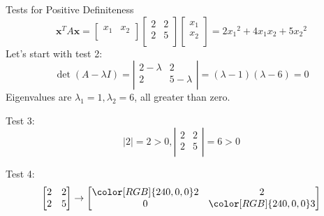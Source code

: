 \documentclass{beamer}
\begin{document}
\begin{frame}{Tests for Positive Definiteness}
\begin{equation*}
    \mathbf{x}^TA\mathbf{x}=\left[ \begin{matrix}
        x_1&		x_2\\
    \end{matrix} \right] \left[ \begin{matrix}
        2&		2\\
        2&		5\\
    \end{matrix} \right] \left[ \begin{array}{c}
        x_1\\
        x_2\\
    \end{array} \right] =2{x_1}^2+4x_1x_2+5{x_2}^2
\end{equation*}
Let's start with test 2:
\begin{equation*}
    \det \left( A-\lambda I \right) =\left| \begin{matrix}
        2-\lambda&		2\\
        2&		5-\lambda\\
    \end{matrix} \right|=\left( \lambda -1 \right) \left( \lambda -6 \right) =0
\end{equation*}
Eigenvalues are $\lambda _1=1, \lambda _2=6$, all greater than zero.

\vspace{3pt}
Test 3:
\begin{equation*}
    |2|=2>0, \left| \begin{matrix}
        2&		2\\
        2&		5\\
    \end{matrix} \right|=6>0
\end{equation*}

\vspace{3pt}
Test 4:
\begin{equation*}
    \left[ \begin{matrix}
        2&		2\\
        2&		5\\
    \end{matrix} \right] \rightarrow \left[ \begin{matrix}
        {\color[RGB]{240, 0, 0} 2}&		2\\
        0&		{\color[RGB]{240, 0, 0} 3}\\
    \end{matrix} \right]
\end{equation*}
\end{frame}
\end{document}
